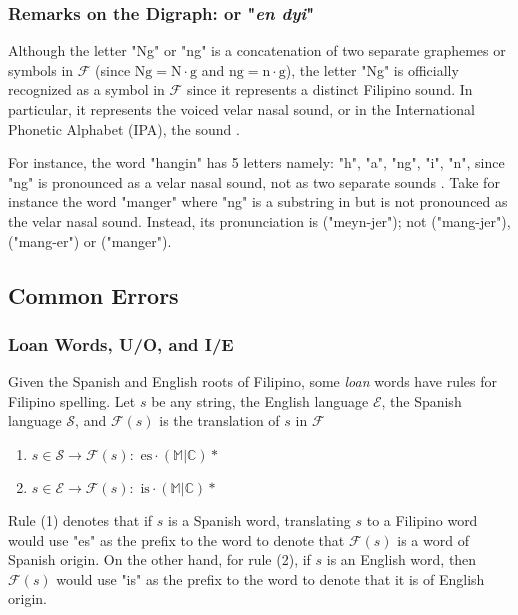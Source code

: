 \subsubsection{Remarks on the Digraph:  or "\textit{en dyi}"}

Although the letter "Ng" or "ng" is a concatenation of two separate graphemes or
symbols in \(\mathcal{F}\) (since \(\text{Ng} = \text{N}\cdot\text{g}\) and
\(\text{ng} = \text{n}\cdot\text{g}\)), the letter "Ng" is officially recognized
as a symbol in \(\mathcal{F}\) since it represents a distinct Filipino sound.
In particular, it represents the voiced velar nasal sound, or in the International
Phonetic Alphabet (IPA), the  sound \cite{Malabonga_2009}.

For instance, the word "hangin" has 5 letters namely: "h", "a", "ng", "i", "n",
since "ng" is pronounced as a velar nasal sound, not as two separate sounds
. Take for instance the word "manger" where "ng" is a substring in
but is not pronounced as the velar nasal sound. Instead, its pronunciation is
 ("meyn-jer"); not
 ("mang-jer"),
 ("mang-er") or
 ("manger").

\subsection{Common Errors}

\subsubsection{Loan Words, U/O, and I/E}

Given the Spanish and English roots of Filipino, some \textit{loan} words have
rules for Filipino spelling. Let \(s\) be any string, the English language
\(\mathcal{E}\), the Spanish language \(\mathcal{S}\), and \(\mathcal{F}(s)\) is
the translation of \(s\) in \(\mathcal{F}\)

\begin{enumerate}
    \item \(s\in \mathcal{S} \rightarrow \mathcal{F}(s) : \text{ es}\cdot
          (\mathbb{M}|\mathbb{C})* \)
    \item \(s\in \mathcal{E} \rightarrow \mathcal{F}(s) : \text{ is}\cdot
          (\mathbb{M}|\mathbb{C})* \)
\end{enumerate}

Rule (1) denotes that if \(s\) is a Spanish word, translating \(s\) to a Filipino
word would use "es" as the prefix to the word to denote that \(\mathcal{F}(s)\)
is a word of Spanish origin. On the other hand, for rule (2), if \(s\) is an
English word, then \(\mathcal{F}(s)\) would use "is" as the prefix to the word
to denote that it is of English origin.

